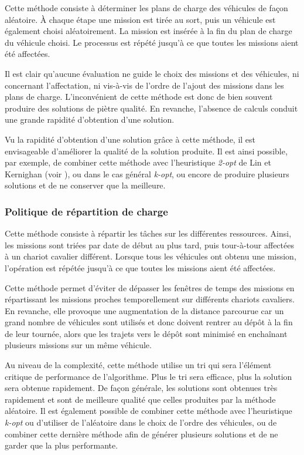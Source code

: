 Cette méthode consiste à déterminer les plans de charge des véhicules de façon aléatoire. À chaque étape une mission est tirée au sort, puis un véhicule est également choisi aléatoirement. La mission est insérée à la fin du plan de charge du véhicule choisi. Le processus est répété jusqu'à ce que toutes les missions aient été affectées.

Il est clair qu'aucune évaluation ne guide le choix des missions et des véhicules, ni concernant l'affectation, ni vis-à-vis de l'ordre de l'ajout des missions dans les plans de charge. L'inconvénient de cette méthode est donc de bien souvent produire des solutions de piètre qualité. En revanche, l'absence de calculs conduit une grande rapidité d'obtention d'une solution.

Vu la rapidité d'obtention d'une solution grâce à cette méthode, il est envisageable d'améliorer la qualité de la solution produite. Il est ainsi possible, par exemple, de combiner cette méthode avec l'heuristique \textit{2-opt} de Lin et Kernighan (voir \cite{Lin1973}), ou dans le cas général \textit{k-opt}, ou encore de produire plusieurs solutions et de ne conserver que la meilleure.

\subsubsection{Politique de répartition de charge}\label{chap:ordo:reso:linear}

Cette méthode consiste à répartir les tâches sur les différentes ressources. Ainsi, les missions sont triées par date de début au plus tard, puis tour-à-tour affectées à un chariot cavalier différent. Lorsque tous les véhicules ont obtenu une mission, l'opération est répétée jusqu'à ce que toutes les missions aient été affectées.

Cette méthode permet d'éviter de dépasser les fenêtres de temps des missions en répartissant les missions proches temporellement sur différents chariots cavaliers. En revanche, elle provoque une augmentation de la distance parcourue car un grand nombre de véhicules sont utilisés et donc doivent rentrer au dépôt à la fin de leur tournée, alors que les trajets vers le dépôt sont minimisé en enchaînant plusieurs missions sur un même véhicule.

Au niveau de la complexité, cette méthode utilise un tri qui sera l'élément critique de performance de l'algorithme. Plus le tri sera efficace, plus la solution sera obtenue rapidement. De façon générale, les solutions sont obtenues très rapidement et sont de meilleure qualité que celles produites par la méthode aléatoire. Il est également possible de combiner cette méthode avec l'heuristique \textit{k-opt} ou d'utiliser de l'aléatoire dans le choix de l'ordre des véhicules, ou de combiner cette dernière méthode afin de générer plusieurs solutions et de ne garder que la plus performante.

